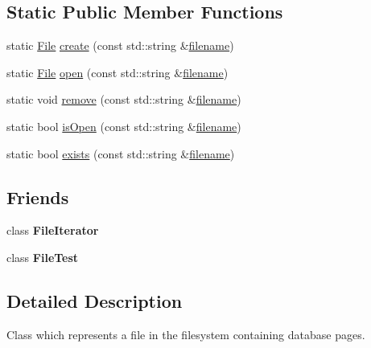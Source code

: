 \subsection*{Static Public Member Functions}
\begin{DoxyCompactItemize}
\item 
static \hyperlink{classbadgerdb_1_1File}{File} \hyperlink{classbadgerdb_1_1File_a1fb708b45103a606f189850d6bf83a0c}{create} (const std\-::string \&\hyperlink{classbadgerdb_1_1File_ac61ce3c2233fd1f7e2e2a8a5a7640936}{filename})
\item 
static \hyperlink{classbadgerdb_1_1File}{File} \hyperlink{classbadgerdb_1_1File_a8462afdbd250c0a483ddfbde144c8732}{open} (const std\-::string \&\hyperlink{classbadgerdb_1_1File_ac61ce3c2233fd1f7e2e2a8a5a7640936}{filename})
\item 
static void \hyperlink{classbadgerdb_1_1File_a1cc69467366badbd68021ac76a91190e}{remove} (const std\-::string \&\hyperlink{classbadgerdb_1_1File_ac61ce3c2233fd1f7e2e2a8a5a7640936}{filename})
\item 
static bool \hyperlink{classbadgerdb_1_1File_a64836156a9bb5f81d2c2c4e6f3ada24d}{is\-Open} (const std\-::string \&\hyperlink{classbadgerdb_1_1File_ac61ce3c2233fd1f7e2e2a8a5a7640936}{filename})
\item 
static bool \hyperlink{classbadgerdb_1_1File_a864d59b12302c26b14967bd1d3e520bd}{exists} (const std\-::string \&\hyperlink{classbadgerdb_1_1File_ac61ce3c2233fd1f7e2e2a8a5a7640936}{filename})
\end{DoxyCompactItemize}
\subsection*{Friends}
\begin{DoxyCompactItemize}
\item 
\hypertarget{classbadgerdb_1_1File_a3cd56c83d638b63a676ae3c4b51dc1b2}{class {\bfseries File\-Iterator}}\label{classbadgerdb_1_1File_a3cd56c83d638b63a676ae3c4b51dc1b2}

\item 
\hypertarget{classbadgerdb_1_1File_a400f700afa1fdf03ca18d08ab8ade7f7}{class {\bfseries File\-Test}}\label{classbadgerdb_1_1File_a400f700afa1fdf03ca18d08ab8ade7f7}

\end{DoxyCompactItemize}


\subsection{Detailed Description}
Class which represents a file in the filesystem containing database pages. 

